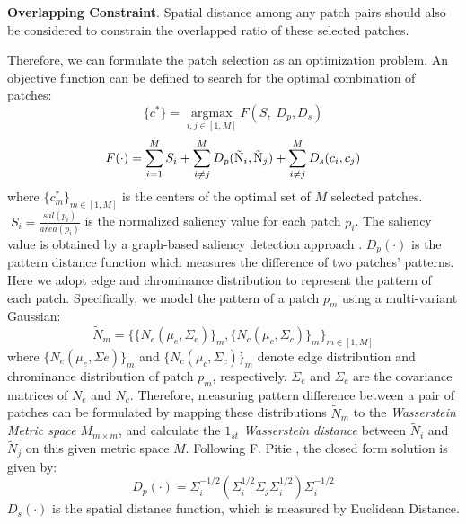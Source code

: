 \documentclass[10pt,twocolumn,letterpaper]{article}
\begin{document}
	\textbf{Overlapping Constraint}. Spatial distance among any patch pairs should also be considered to constrain the overlapped ratio of these selected patches. 
	
	Therefore, we can formulate the patch selection as an optimization problem.  An objective function can be defined to search for the optimal combination of patches:
	\begin{equation}
	\{ {c^*}\}  = \mathop {argmax}\limits_{i,j \in [1,M]} F\left( {S,\;{D_p},{D_s}} \right)
	\end{equation}
	\begin{equation}
	F( \cdot ) = \sum\limits_{i = 1}^M {{S_i}}  + \sum\limits_{i \ne j}^M {{D_p}({{{\rm{\tilde N}}}_i},{{{\rm{\tilde N}}}_j}) + \sum\limits_{i \ne j}^M {{D_s}({c_i},{c_j})} }
	\end{equation}
	where ${\{ c_m^ * \} _{m \in [1,M]}}$ is the centers of the optimal set of $M$ selected patches. $\;{S_i} = \frac{{sal({p_i})}}{{area({p_i})}}$ is the normalized saliency value for 
	each patch $p_i$. The saliency value is obtained by a graph-based saliency detection approach \cite{C.Yang:2013:CVPR:graph_based_saliency}.
	${D_p}( \cdot )$ is the pattern distance function which 
	measures the difference of two patches' patterns. 
	Here we adopt edge and chrominance distribution to represent the pattern of each patch. Specifically, we model the pattern of a patch $p_m$ using a multi-variant Gaussian:
	\begin{equation}
	{\tilde N_m} = {\{ {\{ {N_e}({\mu _e},{\Sigma _e})\} _m},{\{ {N_c}({\mu _c},{\Sigma _c})\} _m}\} _{m \in [1,M]}}
	\end{equation}
	where ${\{ {N_e}({\mu _e},{\Sigma e})\} _m}$ and ${\{ {N_c}({\mu _c},{\Sigma _c})\} _m}$ denote edge distribution and chrominance distribution of patch $p_m$, respectively. ${\Sigma _e}$ and ${\Sigma _c}$ are the covariance matrices of $N_e$ and $N_c$. Therefore, measuring pattern difference between a pair of patches can be formulated by mapping these distributions $\tilde N_m$ to the \textit{Wasserstein Metric space} $M_{m \times m}$,  and calculate the \textit{$1_{st}$ Wasserstein distance} between ${\tilde N_i}$ and ${\tilde N_j}$ on this given metric space $M$.
	Following F. Pitie \cite{F.Pitie:2007:color_transfer}, the closed form solution is given by: 
	\begin{equation}
	{D_p}( \cdot ) = \Sigma _i^{ - 1/2}\left( {\Sigma _i^{1/2}{\Sigma _j}\Sigma _i^{1/2}} \right)\Sigma _i^{ - 1/2}
	\end{equation}
	${D_s}( \cdot )$ is the spatial distance function, which is measured by Euclidean Distance.
	
\end{document}
